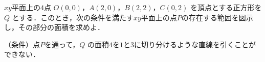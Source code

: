 \documentclass[../../main.tex]{subfiles}
\begin{document}
$xy$平面上の$4$点 $O(0,0)$，$A(2,0)$，$B(2,2)$，$C(0,2)$ を頂点とする正方形を $Q$ とする．このとき，次の条件を満たす$xy$平面上の点$P$の存在する範囲を図示し，その部分の面積を求めよ．

（条件）点$P$を通って，$Q$ の面積$4$を$1$と$3$に切り分けるような直線を引くことができない．
\end{document}

